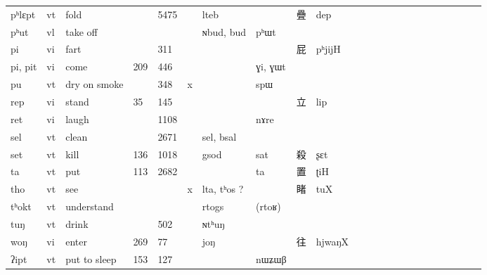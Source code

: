 \documentclass[oldfontcommands,oneside,a4paper,11pt]{article}
\newcommand{\ipa}[1]{{\phon #1}} %
\newcommand{\zh}[1]{{\cn #1}}
\begin{document}
\begin{table}[h]
{\begin{tabular}{lllllllllllllllllllllll}
\ipa{pʰlɛpt}   &  	vt   &  	fold   &  	\tiny    &  	\tiny 5475   &  	   &  	\ipa{lteb}   &  	\ipa{}   &  	\zh{疊}   &  	\ipa{dep}   \\  		
\ipa{pʰut}   &  	vl   &  	take off   &  	\tiny    &  	\tiny    &  	   &  	\ipa{ɴbud, bud}   &  	\ipa{pʰɯt}   &  	\zh{}   &  	\ipa{}   \\  		
\ipa{pi}   &  	vi   &  	fart   &  	\tiny    &  	\tiny 311   &  	   &  	\ipa{}   &  	\ipa{}   &  	\zh{屁}   &  	\ipa{pʰjijH}   \\  		
\ipa{pi, pit}   &  	vi   &  	come   &  	\tiny 209   &  	\tiny 446   &  	   &  	\ipa{}   &  	\ipa{ɣi, ɣɯt}   &  	\zh{}   &  	\ipa{}   \\  		
\ipa{pu}   &  	vt   &  	dry on smoke   &  	\tiny    &  	\tiny 348   &  	x   &  	\ipa{}   &  	\ipa{spɯ}   &  	\zh{}   &  	\ipa{}   \\  		
\ipa{rep}   &  	vi   &  	stand   &  	\tiny 35   &  	\tiny 145   &  	   &  	\ipa{}   &  	\ipa{}   &  	\zh{立}   &  	\ipa{lip}   \\  		
\ipa{ret}   &  	vi   &  	laugh   &  	\tiny    &  	\tiny 1108   &  	   &  	\ipa{}   &  	\ipa{nɤre}   &  	\zh{}   &  	\ipa{}   \\  		
\ipa{sel}   &  	vt   &  	clean   &  	\tiny    &  	\tiny 2671   &  	   &  	\ipa{sel, bsal}   &  	\ipa{}   &  	\zh{}   &  	\ipa{}   \\  		
\ipa{set}   &  	vt   &  	kill   &  	\tiny 136   &  	\tiny 1018   &  	   &  	\ipa{gsod}   &  	\ipa{sat}   &  	\zh{殺}   &  	\ipa{ʂɛt}   \\  		
\ipa{ta}   &  	vt   &  	put   &  	\tiny 113   &  	\tiny 2682   &  	   &  	\ipa{}   &  	\ipa{ta}   &  	\zh{置}   &  	\ipa{ʈiH}   \\  		
\ipa{tho}   &  	vt   &  	see   &  	\tiny     &  	\tiny    &  	x   &  	\ipa{lta,  tʰos ?}   &  	\ipa{}   &  	\zh{睹}   &  	\ipa{tuX}   \\  		
\ipa{tʰokt}   &  	vt   &  	understand   &  	\tiny    &  	\tiny    &  	   &  	\ipa{rtogs}   &  	\ipa{(rtoʁ)}   &  	\zh{}   &  	\ipa{}   \\  		
\ipa{tuŋ}   &  	vt   &  	drink   &  	\tiny    &  	\tiny 502   &  	   &  	\ipa{ɴtʰuŋ}   &  	\ipa{}   &  	\zh{}   &  	\ipa{}   \\  		
\ipa{woŋ}   &  	vi   &  	enter   &  	\tiny 269   &  	\tiny 77   &  	   &  	\ipa{joŋ}   &  	\ipa{}   &  	\zh{往}   &  	\ipa{hjwaŋX}   \\  		
\ipa{ʔipt}   &  	vt   &  	put to sleep   &  	\tiny 153   &  	\tiny 127   &  	   &  	\ipa{}   &  	\ipa{nɯʑɯβ}   &  	\zh{}   &  	\ipa{}   \\  		
\bottomrule
\end{tabular}}
\end{table}
\end{document}
